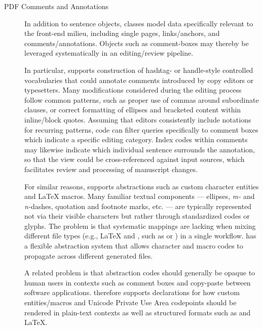 \documentclass[11pt]{article}
\begin{document}
{{\begin{description}
\item[PDF Comments and Annotations]  In addition to sentence 
objects, \PacTk{} classes model data specifically relevant to 
the \PDF{} front-end milieu, including single pages, links/anchors, and 
comments/annotations.  Objects such as comment-boxes 
may thereby be leveraged systematically in an editing/review pipeline.

\pseudoIndent{} In particular, \PacTk{} supports construction of hashtag- or handle-style 
controlled vocabularies that could annotate \PDF{} comments 
introduced by copy editors or typesetters.  Many modifications considered 
during the editing process follow common patterns, such as 
proper use of commas around subordinate clauses, or correct formatting 
of ellipses and bracketed content within inline/block quotes.  Assuming 
that editors consistently include notations for recurring patterns, 
\PacTk{} code can filter queries specifically to \PDF{} comment 
boxes which indicate a specific editing category.  Index codes within 
\PDF{} comments may likewise indicate which individual sentence 
surrounds the annotation, so that the \PDF{} view could be cross-referenced 
against input sources, which facilitates review and processing 
of manuscript changes.


\pseudoIndent{} For similar reasons, \PacTk{} supports abstractions 
such as \XML{} custom character entities and \LaTeX{} macros.  
Many familiar textual components --- ellipses, 
\textit{m-} and \textit{n-}dashes, 
quotation and footnote marks, etc. --- are typically represented 
not via their visible characters but rather through standardized 
codes or glyphs.  The problem is that systematic mappings 
are lacking when mixing different file types (e.g., \LaTeX{} and 
\XML{}, such as \JATS{} or \BITS{}) in a single workflow.  
\lPacTk{} has a flexible abstraction system that allows 
character and macro codes to propagate across different 
generated files.


\pseudoIndent{} A related problem is that abstraction codes should 
generally be opaque to human users in contexts such as 
comment boxes and copy-paste between software applications.  
\lPacTk{} therefore supports declarations for how 
custom entities/macros and Unicode Private Use Area codepoints 
should be rendered in plain-text contexts as well as 
structured formats such as \XML{} and \LaTeX{}.        
 
\end{description}
}





}
\end{document}
